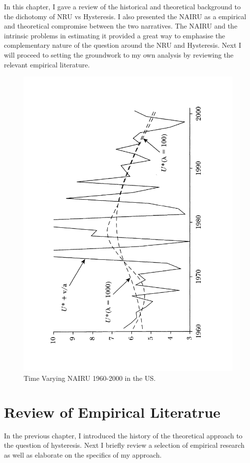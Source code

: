 \documentclass[12pt,a4paper,english]{article}
\begin{document}
In this chapter, I gave a review of the historical and theoretical background to the dichotomy of NRU vs Hysteresis. I also presented the NAIRU as a empirical and theoretical compromise between the two narratives. The NAIRU and the intrinsic problems in estimating it provided a great way to emphasise the complementary nature of the question around the NRU and Hysteresis. Next I will proceed to setting the groundwork to my own analysis by reviewing the relevant empirical literature.

\begin{figure}
\centering
\includegraphics[width=0.8\linewidth,angle=-90]{Graphs/ballmankiwNAIRU}
\caption{Time Varying NAIRU 1960-2000 in the US. \citep{ballmankiw2002}}
\label{ballmankiwNAIRU}
\end{figure}
 

\clearpage
\section{Review of Empirical Literatrue}

In the previous chapter, I introduced the history of the theoretical approach to the question of hysteresis. Next I briefly review a selection of empirical research as well as elaborate on the specifics of my approach.
\end{document}
